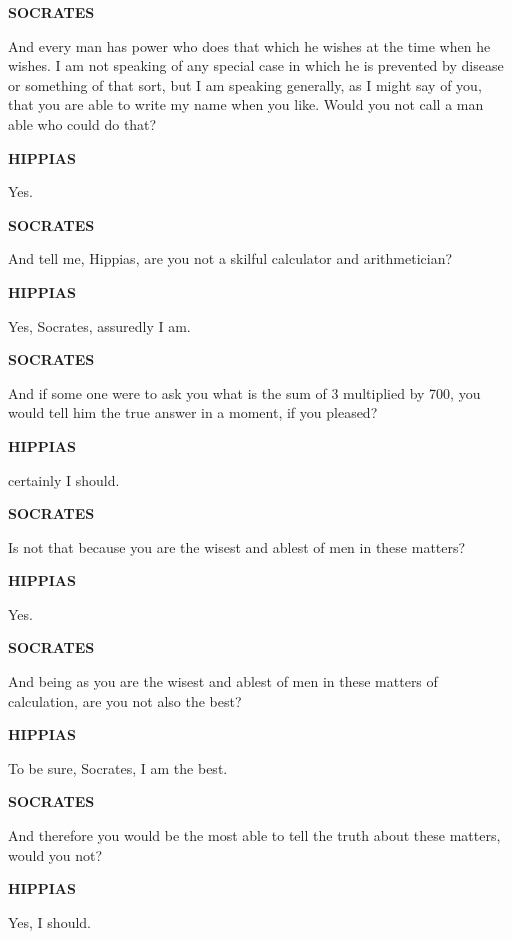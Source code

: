 \documentclass[11pt,letter]{article}
\begin{document}
\par \textbf{SOCRATES}
\par   And every man has power who does that which he wishes at the time when he wishes. I am not speaking of any special case in which he is prevented by disease or something of that sort, but I am speaking generally, as I might say of you, that you are able to write my name when you like. Would you not call a man able who could do that?

\par \textbf{HIPPIAS}
\par   Yes.

\par \textbf{SOCRATES}
\par   And tell me, Hippias, are you not a skilful calculator and arithmetician?

\par \textbf{HIPPIAS}
\par   Yes, Socrates, assuredly I am.

\par \textbf{SOCRATES}
\par   And if some one were to ask you what is the sum of 3 multiplied by 700, you would tell him the true answer in a moment, if you pleased?

\par \textbf{HIPPIAS}
\par   certainly I should.

\par \textbf{SOCRATES}
\par   Is not that because you are the wisest and ablest of men in these matters?

\par \textbf{HIPPIAS}
\par   Yes.

\par \textbf{SOCRATES}
\par   And being as you are the wisest and ablest of men in these matters of calculation, are you not also the best?

\par \textbf{HIPPIAS}
\par   To be sure, Socrates, I am the best.

\par \textbf{SOCRATES}
\par   And therefore you would be the most able to tell the truth about these matters, would you not?

\par \textbf{HIPPIAS}
\par   Yes, I should.
\end{document}

